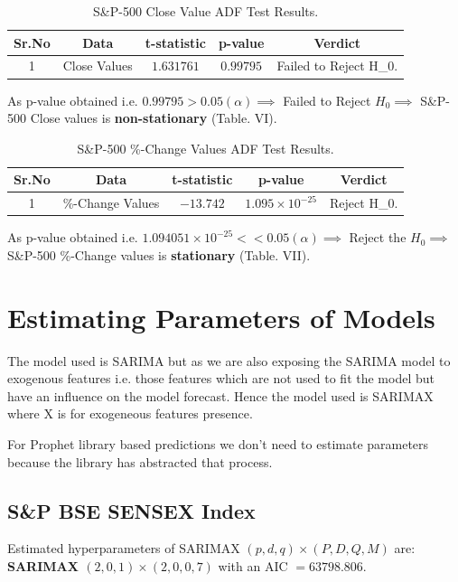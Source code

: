 \documentclass[conference]{IEEEtran}
\begin{document}
\begin{table}[htbp]
	\caption{S\&P-500 Close Value ADF Test Results.}
	\begin{tabular}{|c|c|c|c|c|}
		\hline
		\textbf{Sr.No} & \textbf{Data} & \textbf{t-statistic} & \textbf{p-value} & \textbf{Verdict}        \\
		\hline
		1              & Close Values  & $1.631761$           & $0.99795$        & Failed to Reject H_{0}. \\
		\hline
	\end{tabular}
\end{table}
As p-value obtained i.e. $0.99795 > 0.05 (\alpha) \implies$ Failed to Reject $H_{0} \implies$ S\&P-500 Close values is \textbf{non-stationary} (Table. VI).
	
\begin{table}[htbp]
	\centering
	\caption{S\&P-500 \%-Change Values ADF Test Results.}
	\begin{tabular}{|c|c|c|c|c|}
		\hline
		\textbf{Sr.No} & \textbf{Data}    & \textbf{t-statistic} & \textbf{p-value}        & \textbf{Verdict} \\
		\hline
		1              & \%-Change Values & $-13.742$            & $1.095 \times 10^{-25}$ & Reject H_{0}.    \\
		\hline
	\end{tabular}
\end{table}
As p-value obtained i.e. $1.094051 \times 10^{-25} << 0.05 (\alpha) \implies$ Reject the $H_{0} \implies$ S\&P-500 \%-Change values is \textbf{stationary} (Table. VII).

\section{Estimating Parameters of Models}
The model used is SARIMA but as we are also exposing the SARIMA model to exogenous features i.e. those features which are not used to fit the model but have an influence on the model forecast. Hence the model used is SARIMAX where X is for exogeneous features presence.

For Prophet library based predictions we don't need to estimate parameters because the library has abstracted that process.

\subsection{S\&P BSE SENSEX Index}
Estimated hyperparameters of SARIMAX $(p, d, q) \times (P, D, Q, M)$ are: \textbf{SARIMAX $(2, 0, 1) \times (2, 0, 0, 7)$} with an AIC $=63798.806$.
\end{document}
